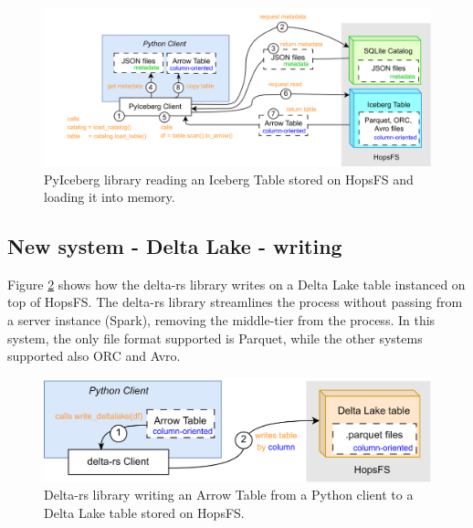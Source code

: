 \begin{figure}
    \begin{center}
      \includegraphics[width=\textwidth]{figures/2-background_and_related_work/iceberg_read.png}
    \end{center}
    \caption[New system - Iceberg - read process]{PyIceberg library reading an Iceberg Table stored on \gls{HopsFS} and loading it into memory.}
    \label{fig:iceberg_read}
\end{figure}



\subsection{New system - Delta Lake - writing}
\label{subsec:back_sys_delta_write}

Figure \ref{fig:delta_write} shows how the delta-rs library writes on a Delta Lake table instanced on top of \gls{HopsFS}. The delta-rs library streamlines the process without passing from a server instance (Spark), removing the middle-tier from the process. In this system, the only file format supported is Parquet, while the other systems supported also ORC and Avro.

\begin{figure}
    \begin{center}
      \includegraphics[width=\textwidth]{figures/2-background_and_related_work/delta_write.png}
    \end{center}
    \caption[New system - Delta Lake - write process]{Delta-rs library writing an Arrow Table from a Python client to a Delta Lake table stored on \gls{HopsFS}.}
    \label{fig:delta_write}
\end{figure}



